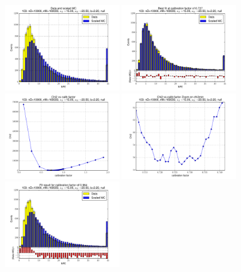 
 \begin{figure}[htbp] \begin{center} 
\includegraphics[width=0.45\textwidth]{../FIGURES/103/FIG_Data_and_scaled_MC.pdf} 
\includegraphics[width=0.45\textwidth]{../FIGURES/103/FIG_Best_fit_at_calibration_factor_of_0_727.pdf} 
\includegraphics[width=0.45\textwidth]{../FIGURES/103/FIG_Chi2_vs_calib_factor.pdf} 
\includegraphics[width=0.45\textwidth]{../FIGURES/103/FIG_Chi2_vs_calib_factor_Zoom_on_chi2min.pdf} 
\includegraphics[width=0.45\textwidth]{../FIGURES/103/FIG_Fit_result_for_calibration_factor_of_0_964.pdf} 

\end{center}
\end{figure}
